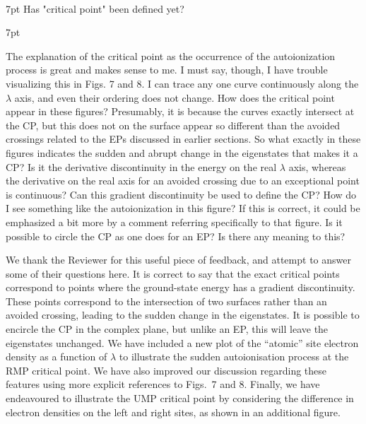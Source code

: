 \documentclass[10pt]{letter}
\newenvironment{formal}{%
  \def\FrameCommand{%
    \hspace{1pt}%
    {\color{darkblue}\vrule width 2pt}%
    {\color{formalshade}\vrule width 4pt}%
    \colorbox{formalshade}%
  }%
  \MakeFramed{\advance\hsize-\width\FrameRestore}%
  \noindent\hspace{-4.55pt}%
  \begin{adjustwidth}{}{7pt}%
  \vspace{2pt}\vspace{2pt}%
}
{%
  \vspace{2pt}\end{adjustwidth}\endMakeFramed%
}
\begin{document}
\begin{letter}
\
\begin{formal}%
Has "critical point" been defined yet?
\end{formal}

\begin{formal}
The explanation of the critical point as the occurrence of the autoionization process is great and makes sense to me. 
I must say, though, I have trouble visualizing this in Figs. 7 and 8. 
I can trace any one curve continuously along the $\lambda$ axis, and even their ordering does not change. 
How does the critical point appear in these figures? 
Presumably, it is because the curves exactly intersect at the CP, but this does not on the surface appear so different than the avoided crossings related to the EPs discussed in earlier sections.
So what exactly in these figures indicates the sudden and abrupt change in the eigenstates that makes it a CP? 
Is it the derivative discontinuity in the energy on the real $\lambda$ axis, whereas the derivative on the real axis for an avoided crossing due to an exceptional point is continuous? 
Can this gradient discontinuity be used to define the CP? 
How do I see something like the autoionization in this figure? 
If this is correct, it could be emphasized a bit more by a comment referring specifically to that figure.
Is it possible to circle the CP as one does for an EP? 
Is there any meaning to this?
\end{formal}

\noindent
We thank the Reviewer for this useful piece of feedback, and attempt to answer some of their questions here.
It is correct to say that the exact critical points correspond to points where the ground-state
energy has a gradient discontinuity. 
These points correspond to the intersection of two surfaces rather than an avoided crossing,
leading to the sudden change in the eigenstates.
It is possible to encircle the CP in the complex plane, but unlike an EP, this will leave the eigenstates unchanged.
We have included a new plot of the ``atomic'' site  electron density as a function of $\lambda$ to illustrate
the sudden autoionisation process at the RMP critical point.
We have also improved our discussion regarding these features using more explicit references to Figs.~7 and 8.
Finally, we have endeavoured to illustrate the UMP critical point by considering the difference in electron densities on the left and right sites, as shown in an additional figure. 


\end{letter}
\end{document}
